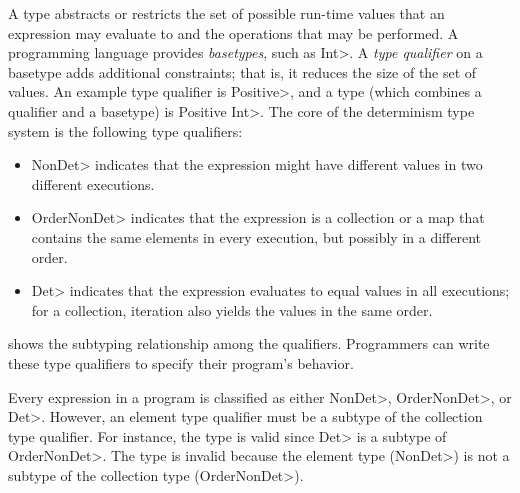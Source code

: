 A type abstracts or restricts the set of possible
run-time values that an expression may evaluate to and the operations that may be performed.
A programming language provides \emph{basetypes}, such as \<Int>.
A \textit{type qualifier} on a basetype adds additional constraints;
that is, it reduces the size of the set of values.
An example type qualifier is \<Positive>, and a type (which combines a qualifier
and a basetype) is \<Positive Int>.
The core of the determinism type system
is the following type qualifiers:
\begin{itemize}
    \item \<NonDet> indicates
    that the expression might have different values in two different executions.
    \item \<OrderNonDet> indicates that the expression is a collection or
    a map that contains the same elements in every execution, but possibly
    in a different order.
    \item \<Det> indicates that the expression evaluates to equal values in
    all executions; for a collection, iteration
    also yields the values in the same order.
\end{itemize}
 shows the subtyping
relationship among the qualifiers.
Programmers can write these type qualifiers to specify their program's behavior.

Every expression in a program is classified as either \<NonDet>, \<OrderNonDet>, or  \<Det>.
However, an element type qualifier must be a subtype of the collection type qualifier.
For instance, the type  is valid since \<Det> is a subtype of
\<OrderNonDet>. The type  is invalid because the element type
(\<NonDet>) is not a subtype of the collection type (\<OrderNonDet>).


